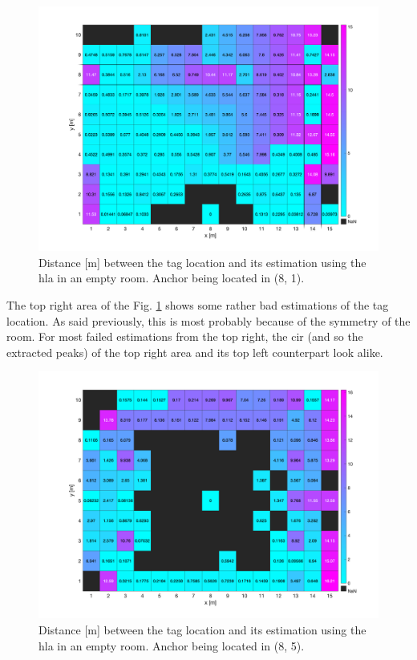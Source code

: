 \begin{figure}[H]
\centering
\includegraphics[width=.9\linewidth]{Images/hla_images/anchor_(8_1).png}
\caption{Distance [m] between the tag location and its estimation using the \gls{hla} in an empty room. Anchor being located in (8, 1).\label{fig:hla_empty_2}}
\end{figure}

The top right area of the Fig. \ref{fig:hla_empty_2} shows some rather bad estimations of the tag location. As said previously, this is most probably because of the symmetry of the room. For most failed estimations from the top right, the \gls{cir} (and so the extracted peaks) of the top right area and its top left counterpart look alike.

\begin{figure}[H]
\centering
\includegraphics[width=.9\linewidth]{Images/hla_images/anchor_(8_5).png}
\caption{Distance [m] between the tag location and its estimation using the \gls{hla} in an empty room. Anchor being located in (8, 5). \label{fig:hla_empty_3}}
\end{figure}

